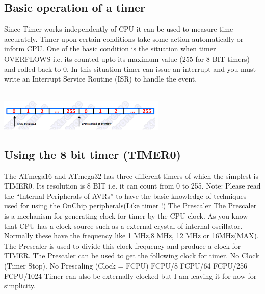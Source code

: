 \subsection{Basic operation of a timer}
Since Timer works independently of CPU it can be used to measure time accurately. Timer upon certain conditions take some action automatically or inform CPU. One of the basic condition is the situation when timer OVERFLOWS i.e. its counted upto its maximum value (255 for 8 BIT timers) and rolled back to 0. In this situation timer can issue an interrupt and you must write an Interrupt Service Routine (ISR) to handle the event.
\\\\
\centerline{
	\includegraphics[width=0.6\textwidth]{overview/images/timer2.png}
}


\subsection{Using the 8 bit timer (TIMER0)}
The ATmega16 and ATmega32 has three different timers of which the simplest is TIMER0. Its resolution is 8 BIT i.e. it can count from 0 to 255. Note: Please read the “Internal Peripherals of AVRs” to have the basic knowledge of techniques used for using the OnChip peripherals(Like timer !) The Prescaler The Prescaler is a mechanism for generating clock for timer by the CPU clock. As you know that CPU has a clock source such as a external crystal of internal oscillator. Normally these have the frequency like 1 MHz,8 MHz, 12 MHz or 16MHz(MAX). The Prescaler is used to divide this clock frequency and produce a clock for TIMER. The Prescaler can be used to get the following clock for timer. No Clock (Timer Stop). No Prescaling (Clock = FCPU) FCPU/8 FCPU/64 FCPU/256 FCPU/1024 Timer can also be externally clocked but I am leaving it for now for simplicity.


